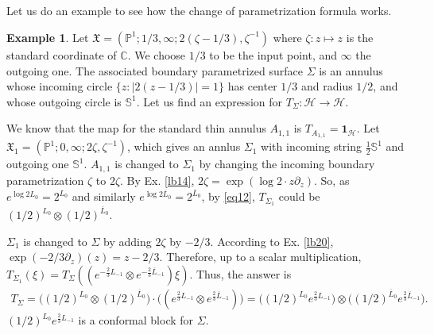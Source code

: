 \documentclass[11pt,b5paper,notitlepage]{article}
\theoremstyle{definition}
\newtheorem{eg}[df]{Example}
\theoremstyle{plain}
\newcommand{\fk}{\mathfrak}
\newcommand{\mc}{\mathcal}
\newcommand{\ovl}{\overline}
\newcommand{\id}{\mathbf{1}}
\newcommand{\Cbb}{\mathbb C}
\newcommand{\Pbb}{\mathbb P}
\newcommand{\Sbb}{{\mathbb S}}
\numberwithin{equation}{section}
\begin{document}
\subsection{}

Let us do an example to see how the change of parametrization formula works. 

\begin{eg}
Let $\fk X=(\Pbb^1;1/3,\infty;2(\zeta-1/3),\zeta^{-1})$ where $\zeta:z\mapsto z$ is the standard coordinate of $\Cbb$. We choose $1/3$ to be the input point, and $\infty$ the outgoing one. The associated boundary parametrized surface $\Sigma$ is an annulus whose incoming circle $\{z:|2(z-1/3)|=1\}$ has center $1/3$ and radius $1/2$, and whose outgoing circle is $\Sbb^1$. Let us find an expression for $T_\Sigma:\mc H\rightarrow\mc H$.

We know that the map for the standard thin annulus $A_{1,1}$ is $T_{A_{1,1}}=\id_{\mc H}$. Let $\fk X_1=(\Pbb^1;0,\infty;2\zeta,\zeta^{-1})$, which gives an annlus $\Sigma_1$ with incoming string $\frac 12\Sbb^1$ and outgoing one $\Sbb^1$. $A_{1,1}$ is changed to $\Sigma_1$ by changing the incoming boundary parametrization $\zeta$ to $2\zeta$. By Ex. \ref{lb14}, $2\zeta=\exp(\log 2\cdot z\partial_z)$. So, as $e^{\log 2L_0}=2^{L_0}$ and similarly $e^{\log 2 \ovl L_0}=2^{\ovl L_0}$, by \eqref{eq12}, $T_{\Sigma_1}$ could be $(1/2)^{L_0}\otimes (1/2)^{\ovl L_0}$.

$\Sigma_1$ is changed to $\Sigma$ by adding $2\zeta$ by $-2/3$. According to Ex. \ref{lb20},  $\exp(-2/3\partial_z)(z)=z-2/3$. Therefore, up to a scalar multiplication, $T_{\Sigma_1}(\xi)=T_\Sigma((e^{-\frac 23 L_{-1}}\otimes e^{-\frac 23 \ovl L_{-1}})\xi)$. Thus, the answer is
\begin{align*}
T_\Sigma=\big((1/2)^{L_0}\otimes (1/2)^{\ovl L_0}\big)\cdot \big((e^{\frac 23 L_{-1}}\otimes e^{\frac 23 \ovl L_{-1}})\big)=\big((1/2)^{L_0}e^{\frac 23L_{-1}}\big)\otimes 	\big((1/2)^{\ovl L_0}e^{\frac 23\ovl L_{-1}}\big).
\end{align*}
$(1/2)^{L_0}e^{\frac 23L_{-1}}$ is a conformal block for $\Sigma$. \hfill\qedsymbol
\end{eg}










\subsection{}\label{lb28}
\end{document}

